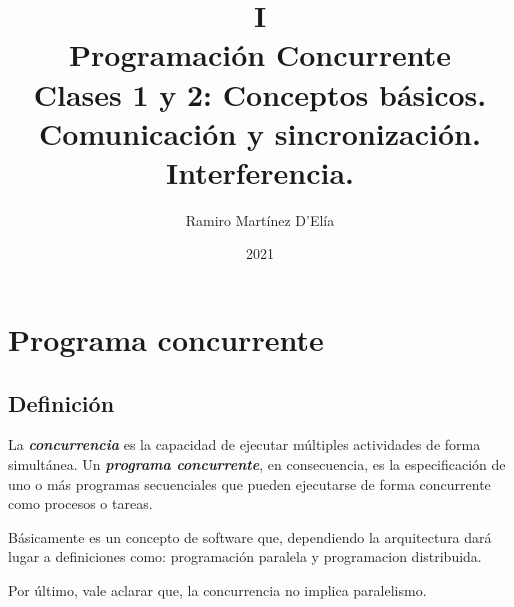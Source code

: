 \documentclass[a4paper, 10pt]{report}
\begin{document}
\title{
	I\\
	Programación Concurrente\\
	\large Clases 1 y 2: Conceptos básicos. Comunicación y sincronización. Interferencia.
}

\author{Ramiro Martínez D'Elía}
\date{2021}
\maketitle

\tableofcontents

\chapter{Programa concurrente}

\section{Definición}

La \textbf{\emph{concurrencia}} es la capacidad de ejecutar múltiples actividades de forma simultánea. Un \textbf{\emph{programa concurrente}}, en consecuencia, es la especificación de uno o más programas secuenciales que pueden ejecutarse de forma concurrente como procesos o tareas. 

Básicamente es un concepto de software que, dependiendo la arquitectura dará lugar a definiciones como: programación paralela y programacion distribuida. 

Por último, vale aclarar que, la concurrencia no implica paralelismo.
\end{document}
